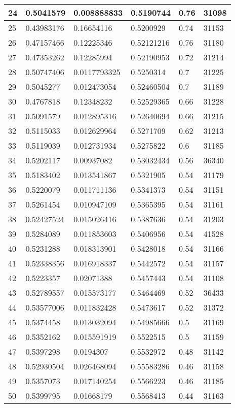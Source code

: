 \begin{longtable}{|l|l|l|l|l|l|}
24 & 0.5041579 & 0.008888833 & 0.5190744 & 0.76 & 31098 \\ \hline 
25 & 0.43983176 & 0.16654116 & 0.5200929 & 0.74 & 31153 \\ \hline 
26 & 0.47157466 & 0.12225346 & 0.52121216 & 0.76 & 31180 \\ \hline 
27 & 0.47353262 & 0.12285994 & 0.52190953 & 0.72 & 31214 \\ \hline 
28 & 0.50747406 & 0.0117793325 & 0.5250314 & 0.7 & 31225 \\ \hline 
29 & 0.5045277 & 0.012473054 & 0.52460504 & 0.7 & 31189 \\ \hline 
30 & 0.4767818 & 0.12348232 & 0.52529365 & 0.66 & 31228 \\ \hline 
31 & 0.5091579 & 0.012895316 & 0.52640694 & 0.66 & 31215 \\ \hline 
32 & 0.5115033 & 0.012629964 & 0.5271709 & 0.62 & 31213 \\ \hline 
33 & 0.5119039 & 0.012731934 & 0.5275822 & 0.6 & 31185 \\ \hline 
34 & 0.5202117 & 0.00937082 & 0.53032434 & 0.56 & 36340 \\ \hline 
35 & 0.5183402 & 0.013541867 & 0.5321905 & 0.54 & 31179 \\ \hline 
36 & 0.5220079 & 0.011711136 & 0.5341373 & 0.54 & 31151 \\ \hline 
37 & 0.5261454 & 0.010947109 & 0.5365395 & 0.54 & 31161 \\ \hline 
38 & 0.52427524 & 0.015026416 & 0.5387636 & 0.54 & 31203 \\ \hline 
39 & 0.5284089 & 0.011853603 & 0.5406956 & 0.54 & 41528 \\ \hline 
40 & 0.5231288 & 0.018313901 & 0.5428018 & 0.54 & 31166 \\ \hline 
41 & 0.52338356 & 0.016918337 & 0.5442572 & 0.54 & 31157 \\ \hline 
42 & 0.5223357 & 0.02071388 & 0.5457443 & 0.54 & 31108 \\ \hline 
43 & 0.52789557 & 0.015573177 & 0.5464469 & 0.52 & 36433 \\ \hline 
44 & 0.53577006 & 0.011832428 & 0.5473617 & 0.52 & 31372 \\ \hline 
45 & 0.5374458 & 0.013032094 & 0.54985666 & 0.5 & 31169 \\ \hline 
46 & 0.5352162 & 0.015591919 & 0.5522515 & 0.5 & 31159 \\ \hline 
47 & 0.5397298 & 0.0194307 & 0.5532972 & 0.48 & 31142 \\ \hline 
48 & 0.52930504 & 0.026468094 & 0.55583286 & 0.46 & 31158 \\ \hline 
49 & 0.5357073 & 0.017140254 & 0.5566223 & 0.46 & 31185 \\ \hline 
50 & 0.5399795 & 0.01668179 & 0.5568413 & 0.44 & 31163 \\ \hline 
\end{longtable}